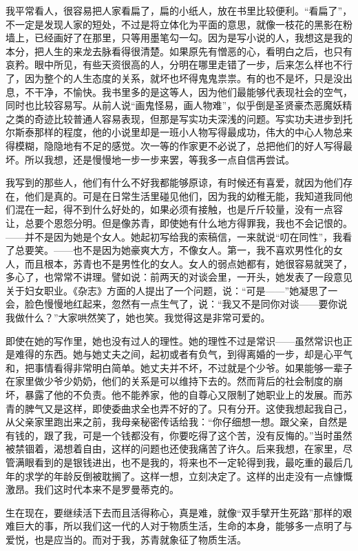 \par 我平常看人，很容易把人家看扁了，扁的小纸人，放在书里比较便利。“看扁了”，不一定是发现人家的短处，不过是将立体化为平面的意思，就像一枝花的黑影在粉墙上，已经画好了在那里，只等用墨笔勾一勾。因为是写小说的人，我想这是我的本分，把人生的来龙去脉看得很清楚。如果原先有憎恶的心，看明白之后，也只有哀矜。眼中所见，有些天资很高的人，分明在哪里走错了一步，后来怎么样也不行了，因为整个的人生态度的关系，就坏也坏得鬼鬼祟祟。有的也不是坏，只是没出息，不干净，不愉快。我书里多的是这等人，因为他们最能够代表现社会的空气，同时也比较容易写。从前人说“画鬼怪易，画人物难”，似乎倒是圣贤豪杰恶魔妖精之类的奇迹比较普通人容易表现，但那是写实功夫深浅的问题。写实功夫进步到托尔斯泰那样的程度，他的小说里却是一班小人物写得最成功，伟大的中心人物总来得模糊，隐隐地有不足的感觉。次一等的作家更不必说了，总把他们的好人写得最坏。所以我想，还是慢慢地一步一步来罢，等我多一点自信再尝试。
\par 我写到的那些人，他们有什么不好我都能够原谅，有时候还有喜爱，就因为他们存在，他们是真的。可是在日常生活里碰见他们，因为我的幼稚无能，我知道我同他们混在一起，得不到什么好处的，如果必须有接触，也是斤斤较量，没有一点容让，总要个恩怨分明。但是像苏青，即使她有什么地方得罪我，我也不会记恨的。——并不是因为她是个女人。她起初写给我的索稿信，一来就说“叨在同性”，我看了总要笑。——也不是因为她豪爽大方，不像女人。第一，我不喜欢男性化的女人，而且根本，苏青也不是男性化的女人。女人的弱点她都有，她很容易就哭了，多心了，也常常不讲理。譬如说：前两天的对谈会里，一开头，她发表了一段意见关于妇女职业。《杂志》方面的人提出了一个问题，说：“可是——”她凝思了一会，脸色慢慢地红起来，忽然有一点生气了，说：“我又不是同你对谈——要你说我做什么？”大家哄然笑了，她也笑。我觉得这是非常可爱的。
\par 即使在她的写作里，她也没有过人的理性。她的理性不过是常识——虽然常识也正是难得的东西。她与她丈夫之间，起初或者有负气，到得离婚的一步，却是心平气和，把事情看得非常明白简单。她丈夫并不坏，不过就是个少爷。如果能够一辈子在家里做少爷少奶奶，他们的关系是可以维持下去的。然而背后的社会制度的崩坏，暴露了他的不负责。他不能养家，他的自尊心又限制了她职业上的发展。而苏青的脾气又是这样，即使委曲求全也弄不好的了。只有分开。这使我想起我自己，从父亲家里跑出来之前，我母亲秘密传话给我：“你仔细想一想。跟父亲，自然是有钱的，跟了我，可是一个钱都没有，你要吃得了这个苦，没有反悔的。”当时虽然被禁锢着，渴想着自由，这样的问题也还使我痛苦了许久。后来我想，在家里，尽管满眼看到的是银钱进出，也不是我的，将来也不一定轮得到我，最吃重的最后几年的求学的年龄反倒被耽搁了。这样一想，立刻决定了。这样的出走没有一点慷慨激昂。我们这时代本来不是罗曼蒂克的。
\par 生在现在，要继续活下去而且活得称心，真是难，就像“双手擘开生死路”那样的艰难巨大的事，所以我们这一代的人对于物质生活，生命的本身，能够多一点明了与爱悦，也是应当的。而对于我，苏青就象征了物质生活。
